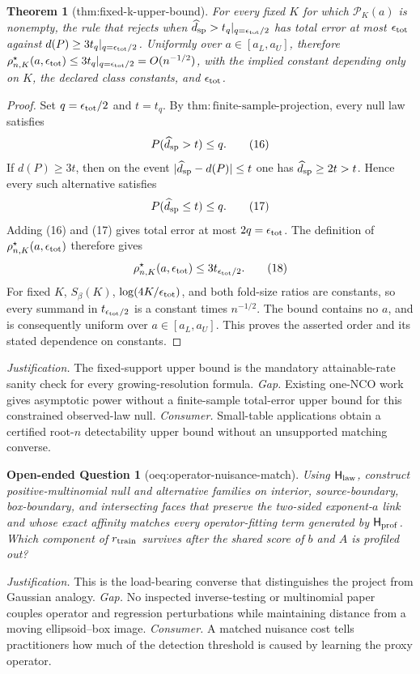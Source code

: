\documentclass{article}
\newtheorem{theorem}{Theorem}
\newtheorem{openendedquestion}{Open-ended Question}
\begin{document}
\begin{theorem}[thm:fixed-k-upper-bound]\label{thm:fixed-k-upper-bound}
For every fixed \(K\) for which \(\mathcal P_K(a)\) is nonempty, the rule that rejects when \(\widehat d_{\rm sp}>t_q\vert_{q=\epsilon_{\rm tot}/2}\) has total error at most \(\epsilon_{\rm tot}\) against \(d(P)\ge3t_q\vert_{q=\epsilon_{\rm tot}/2}\). Uniformly over \(a\in[a_L,a_U]\), therefore \(\rho^\star_{n,K}(a,\epsilon_{\rm tot})\le3t_q\vert_{q=\epsilon_{\rm tot}/2}=O(n^{-1/2})\), with the implied constant depending only on \(K\), the declared class constants, and \(\epsilon_{\rm tot}\).
\end{theorem}
\begin{proof}
Set \(q=\epsilon_{\rm tot}/2\) and \(t=t_q\).  By \(\mathrm{thm:finite\mbox{-}sample\mbox{-}projection}\), every null law satisfies
\[
 P(\widehat d_{\rm sp}>t)\le q. \tag{16}
\]
If \(d(P)\ge3t\), then on the event \(|\widehat d_{\rm sp}-d(P)|\le t\) one has \(\widehat d_{\rm sp}\ge2t>t\).  Hence every such alternative satisfies
\[
 P(\widehat d_{\rm sp}\le t)\le q. \tag{17}
\]
Adding (16) and (17) gives total error at most \(2q=\epsilon_{\rm tot}\).  The definition of \(\rho^\star_{n,K}(a,\epsilon_{\rm tot})\) therefore gives
\[
 \rho^\star_{n,K}(a,\epsilon_{\rm tot})\le3t_{\epsilon_{\rm tot}/2}. \tag{18}
\]
For fixed \(K\), \(S_\beta(K)\), \(\log(4K/\epsilon_{\rm tot})\), and both fold-size ratios are constants, so every summand in \(t_{\epsilon_{\rm tot}/2}\) is a constant times \(n^{-1/2}\).  The bound contains no \(a\), and is consequently uniform over \(a\in[a_L,a_U]\).  This proves the asserted order and its stated dependence on constants.
\end{proof}
\par\smallskip\noindent \textit{Justification.} The fixed-support upper bound is the mandatory attainable-rate sanity check for every growing-resolution formula. \textit{Gap.} Existing one-NCO work gives asymptotic power without a finite-sample total-error upper bound for this constrained observed-law null. \textit{Consumer.} Small-table applications obtain a certified root-\(n\) detectability upper bound without an unsupported matching converse.

\begin{openendedquestion}[oeq:operator-nuisance-match]\label{oeq:operator-nuisance-match}
Using \(\mathsf H_{\rm law}\), construct positive-multinomial null and alternative families on interior, source-boundary, box-boundary, and intersecting faces that preserve the two-sided exponent-\(a\) link and whose exact affinity matches every operator-fitting term generated by \(\mathsf H_{\rm prof}\). Which component of \(r_{\rm train}\) survives after the shared score of \(b\) and \(A\) is profiled out?
\end{openendedquestion}
\par\smallskip\noindent \textit{Justification.} This is the load-bearing converse that distinguishes the project from Gaussian analogy. \textit{Gap.} No inspected inverse-testing or multinomial paper couples operator and regression perturbations while maintaining distance from a moving ellipsoid--box image. \textit{Consumer.} A matched nuisance cost tells practitioners how much of the detection threshold is caused by learning the proxy operator.
\end{document}
